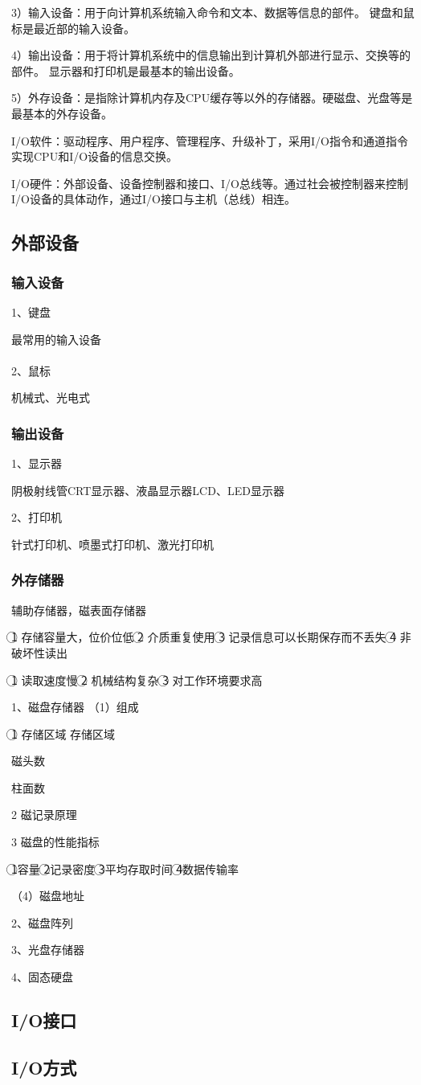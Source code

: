 \documentclass{ctexart}
\begin{document}
3）输入设备：用于向计算机系统输入命令和文本、数据等信息的部件。
键盘和鼠标是最近部的输入设备。

4）输出设备：用于将计算机系统中的信息输出到计算机外部进行显示、交换等的部件。
显示器和打印机是最基本的输出设备。

5）外存设备：是指除计算机内存及CPU缓存等以外的存储器。硬磁盘、光盘等是最基本的外存设备。

I/O软件：驱动程序、用户程序、管理程序、升级补丁，采用I/O指令和通道指令实现CPU和I/O设备的信息交换。

I/O硬件：外部设备、设备控制器和接口、I/O总线等。通过社会被控制器来控制I/O设备的具体动作，通过I/O接口与主机（总线）相连。

\subsection{外部设备}

\subsubsection{输入设备}
1、键盘

最常用的输入设备
\\\\

2、鼠标

机械式、光电式


\subsubsection{输出设备}

1、显示器

阴极射线管CRT显示器、液晶显示器LCD、LED显示器


2、打印机

针式打印机、喷墨式打印机、激光打印机

\subsubsection{外存储器}

辅助存储器，磁表面存储器

\textcircled{1} 存储容量大，位价位低
\textcircled{2} 介质重复使用
\textcircled{3} 记录信息可以长期保存而不丢失
\textcircled{4} 非破坏性读出

\textcircled{1} 读取速度慢
\textcircled{2} 机械结构复杂
\textcircled{3} 对工作环境要求高

1、磁盘存储器
（1）组成

\textcircled{1} 存储区域
存储区域

磁头数

柱面数

{2} 磁记录原理

{3 }磁盘的性能指标

\textcircled{1}容量
\textcircled{2}记录密度
\textcircled{3}平均存取时间
\textcircled{4}数据传输率

（4）磁盘地址

2、磁盘阵列

3、光盘存储器

4、固态硬盘

\subsection{I/O接口}

\subsection{I/O方式}
\end{document}
